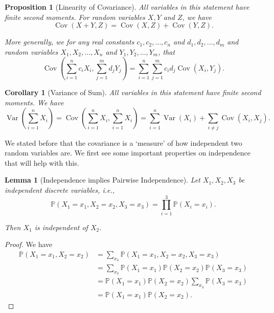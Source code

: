 \documentclass[11pt]{article}
\numberwithin{equation}{section}
\newtheorem{lemma}[theorem]{Lemma}
\newtheorem{proposition}[theorem]{Proposition}
\newtheorem{corollary}[theorem]{Corollary}
\theoremstyle{definition}
\theoremstyle{remark}
\newcommand{\pqty}[1]{\left(#1\right)}
\newcommand{\Prob}{\mathbb P}
\DeclareMathOperator{\Var}{Var}
\DeclareMathOperator{\Cov}{Cov}
\begin{document}
\begin{proposition}[Linearity of Covariance]\label{probability-proposition-015}
    \label{probability-prop:linearity-of-covariance}
All variables in this statement have finite second moments.
%
    For random variables \(X, Y\) and \(Z\), we have
    \[
        \Cov\pqty{X + Y, Z} = \Cov\pqty{X, Z} + \Cov\pqty{Y, Z}.
    \]

    More generally, we for any real constants  \(c_1, c_2, \ldots, c_n\) and \(d_1, d_2, \ldots, d_m\) and random variables \(X_1, X_2, \ldots, X_n\) and \(Y_1, Y_2, \ldots, Y_m\), that
    \[
        \Cov\pqty{\sum_{i = 1}^{n} c_i X_i, \sum_{j = 1}^{m} d_j Y_j} = \sum_{i = 1}^{n} \sum_{j = 1}^{m} c_i d_j \Cov\pqty{X_i, Y_j}.
    \]
\end{proposition}

\begin{corollary}[Variance of Sum]\label{probability-corollary-004}
    \label{probability-cor:variance-of-sum}
All variables in this statement have finite second moments.
%
    We have
    \[
        \Var\pqty{\sum_{i = 1}^{n} X_i} = \Cov\pqty{\sum_{i = 1}^{n} X_i, \sum_{i = 1}^{n} X_i} = \sum_{i = 1}^{n} \Var\pqty{X_i} + \sum_{i \neq j} \Cov\pqty{X_i, X_j}.
    \]
\end{corollary}

We stated before that the covariance is a `measure' of how independent two random variables are. We first see some important properties on independence that will help with this.

\begin{lemma}[Independence implies Pairwise Independence]\label{probability-lemma-005}
    \label{probability-lem:indep-pairwise-indep}%
    Let \(X_1, X_2, X_3\) be independent discrete variables, i.e.,
    \[
        \Prob\pqty{X_1 = x_1, X_2 = x_2, X_3 = x_3} = \prod_{i = 1}^{3} \Prob\pqty{X_i = x_i}.
    \]

    Then \(X_1\) is independent of \(X_2\).
\end{lemma}

\begin{proof}\label{probability-proof-024}
    We have
    \begin{align*}
        \Prob\pqty{X_1 = x_1, X_2 = x_2} &= \sum_{x_3} \Prob\pqty{X_1 = x_1, X_2 = x_2, X_3 = x_3} \\
        &= \sum_{x_3} \Prob\pqty{X_1 = x_1} \Prob\pqty{X_2 = x_2} \Prob\pqty{X_3 = x_3} \\
        &= \Prob\pqty{X_1 = x_1} \Prob\pqty{X_2 = x_2} \sum_{x_3} \Prob\pqty{X_3 = x_3} \\
        &= \Prob\pqty{X_1 = x_1} \Prob\pqty{X_2 = x_2}.
    \end{align*}
\end{proof}
\end{document}
